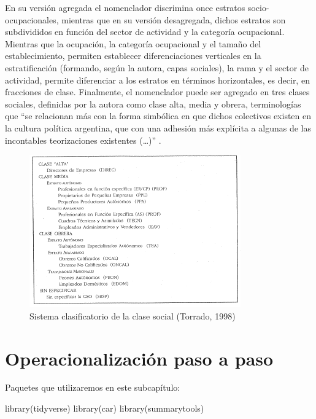 \documentclass[
]{book}
\newenvironment{Shaded}{\begin{snugshade}}{\end{snugshade}}
\newcommand{\FunctionTok}[1]{\textcolor[rgb]{0.00,0.00,0.00}{#1}}
\newcommand{\NormalTok}[1]{#1}
\begin{document}
En su versión agregada el nomenclador discrimina once estratos socio-ocupacionales, mientras que en su versión desagregada, dichos estratos son subdivididos en función del sector de actividad y la categoría ocupacional. Mientras que la ocupación, la categoría ocupacional y el tamaño del establecimiento, permiten establecer diferenciaciones verticales en la estratificación (formando, según la autora, capas sociales), la rama y el sector de actividad, permite diferenciar a los estratos en términos horizontales, es decir, en fracciones de clase. Finalmente, el nomenclador puede ser agregado en tres clases sociales, definidas por la autora como clase alta, media y obrera, terminologías que ``se relacionan más con la forma simbólica en que dichos colectivos existen en la cultura política argentina, que con una adhesión más explícita a algunas de las incontables teorizaciones existentes (\ldots)'' \citep[pp.~236]{Torrado1998d}.

\begin{figure}

{\centering \includegraphics[width=0.8\linewidth]{imagenes/torrado3} 

}

\caption{Sistema clasificatorio de la clase social (Torrado, 1998)}\label{fig:unnamed-chunk-69}
\end{figure}

\hypertarget{operacion1}{%
\section{Operacionalización paso a paso}\label{operacion1}}

Paquetes que utilizaremos en este subcapítulo:

\begin{Shaded}
\begin{Highlighting}[]
\FunctionTok{library}\NormalTok{(tidyverse)}
\FunctionTok{library}\NormalTok{(car)}
\FunctionTok{library}\NormalTok{(summarytools)}
\end{Highlighting}
\end{Shaded}
\end{document}

